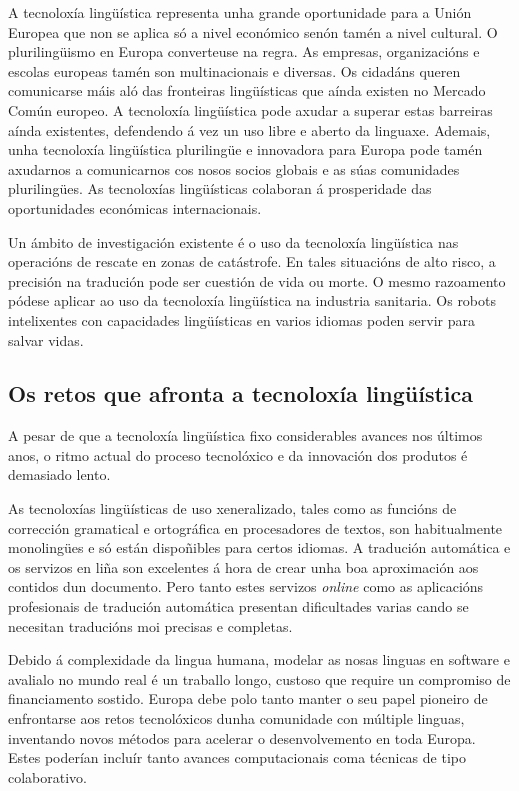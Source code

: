 \begin{multicols}{2}

A tecnoloxía lingüística representa unha grande oportunidade para a Unión Europea que non se aplica só a nivel económico senón tamén a nivel cultural. O plurilingüismo en Europa converteuse na regra. As empresas, organizacións e escolas europeas tamén son multinacionais e diversas. Os cidadáns queren comunicarse máis aló das fronteiras lingüísticas que aínda existen no Mercado Común europeo. A tecnoloxía lingüística pode axudar a superar estas barreiras aínda existentes, defendendo á vez un uso libre e aberto da linguaxe. Ademais, unha tecnoloxía lingüística plurilingüe e innovadora para Europa pode tamén axudarnos a comunicarnos cos nosos socios globais e as súas comunidades plurilingües. As tecnoloxías lingüísticas colaboran á prosperidade das oportunidades económicas internacionais.


Un ámbito de investigación existente é o uso da tecnoloxía lingüística nas operacións de rescate en zonas de catástrofe. En tales situacións de alto risco, a precisión na tradución pode ser cuestión de vida ou morte. O mesmo razoamento pódese aplicar ao uso da tecnoloxía lingüística na industria sanitaria. Os robots intelixentes con capacidades lingüísticas en varios idiomas poden servir para salvar vidas. 

\subsection{Os retos que afronta a tecnoloxía lingüística}

   A pesar de que a tecnoloxía lingüística fixo considerables avances nos últimos anos, o ritmo actual do proceso tecnolóxico e da innovación dos produtos é demasiado lento. 

 As tecnoloxías lingüísticas de uso xeneralizado, tales como as funcións de corrección gramatical e ortográfica en procesadores de textos, son habitualmente monolingües e só están dispoñibles para certos idiomas. A tradución automática e os servizos en liña son excelentes á hora de crear unha boa aproximación aos contidos dun documento. Pero tanto estes servizos \textit{online} como as aplicacións profesionais de tradución automática presentan dificultades varias cando se necesitan traducións moi precisas e completas.


Debido á complexidade da lingua humana, modelar as nosas linguas en software e avalialo no mundo real é un traballo longo, custoso que require un compromiso de financiamento sostido. Europa debe polo tanto manter o seu papel pioneiro de enfrontarse aos retos tecnolóxicos dunha comunidade con múltiple linguas, inventando novos métodos para acelerar o desenvolvemento en toda Europa. Estes poderían incluír tanto avances computacionais coma técnicas de tipo colaborativo.


\end{multicols}
